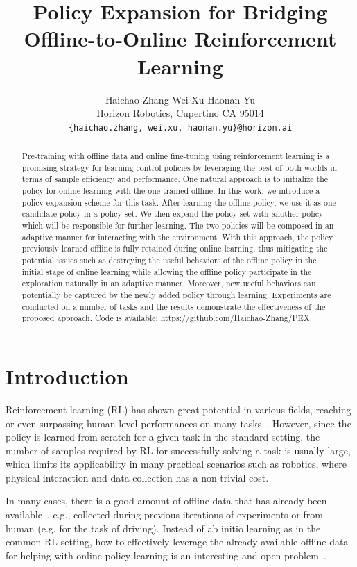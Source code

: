 \documentclass{article}
\title{Policy Expansion for Bridging Offline-to-Online Reinforcement Learning}
\author{Haichao Zhang \quad Wei Xu \quad Haonan Yu \\
Horizon Robotics, Cupertino CA  95014 \\
\texttt{\{haichao.zhang, wei.xu, haonan.yu\}@horizon.ai}}
\begin{document}
\maketitle

\begin{abstract}
Pre-training with offline data and online fine-tuning using reinforcement learning is a promising strategy for learning control policies by leveraging the best of both worlds in terms of sample efficiency and performance. One natural approach is to initialize the policy for online learning with the one trained offline.
In this work, we introduce a policy expansion scheme for this task. After learning the offline policy, we use it as one candidate policy in a policy set. We then expand the policy set with another policy which will be responsible for further learning. The two policies will be composed in an adaptive manner for interacting with the environment. With this approach, the policy previously learned offline is fully retained during online learning, thus mitigating the potential issues such as destroying the useful behaviors of the offline policy in the initial stage of online learning while allowing the offline policy participate in the  exploration  naturally in an adaptive manner. Moreover, new useful behaviors can potentially be captured by the newly added policy through learning.
Experiments are conducted on a number of tasks and the results demonstrate the effectiveness of the proposed approach.
Code is
available: \url{https://github.com/Haichao-Zhang/PEX}.
\end{abstract}


\section{Introduction}


Reinforcement learning (RL) has shown great potential in various fields, reaching or even surpassing human-level performances on many tasks~\citep[e.g.][]{mnih2015humanlevel, alphago, muzero, human_level_planning}.
However, since  the policy is learned from scratch for a given task in the standard setting, the number of samples required by RL for successfully solving a task is usually large,  which limits its applicability in many practical scenarios such as robotics, where physical interaction and data collection has a non-trivial cost.


In many cases, there is a good amount of offline data  that has already been available~\citep{rl_in_robotics, data_driven_driving,data_driven_robotics}, {e.g.}, collected during previous iterations of experiments or from human ({e.g.} for the task of driving).
Instead of ab initio learning as in the common RL setting, how to effectively leverage the already available offline data for helping with online policy learning is an interesting and open problem~\citep{use_offline_buffer, dqn_demo, sac_bc}.
\end{document}
